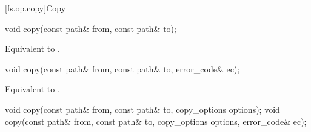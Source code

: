 [fs.op.copy]{Copy}

%
\begin{itemdecl}
void copy(const path& from, const path& to);
\end{itemdecl}

\begin{itemdescr}
\pnum
\effects Equivalent to
.
\end{itemdescr}

%
\begin{itemdecl}
void copy(const path& from, const path& to, error_code& ec);
\end{itemdecl}

\begin{itemdescr}
\pnum
\effects Equivalent to
.
\end{itemdescr}

%
\begin{itemdecl}
void copy(const path& from, const path& to, copy_options options);
void copy(const path& from, const path& to, copy_options options,
          error_code& ec);
\end{itemdecl}

